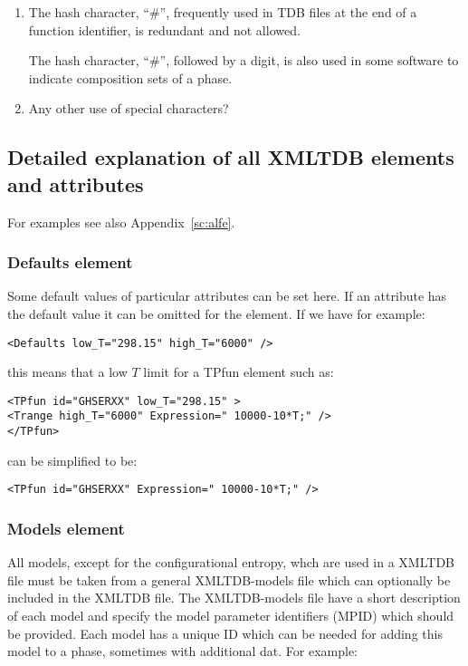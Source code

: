 \documentclass[12pt]{article}
\begin{document}
\begin{appendices}
\begin{enumerate}
\item The hash character, ``\#'', frequently used in TDB files at the
  end of a function identifier, is redundant and not allowed.

  The hash character, ``\#'', followed by a digit, is also used in
  some software to indicate composition sets of a phase.

\item Any other use of special characters?

\end{enumerate}
  
\subsection{Detailed explanation of all XMLTDB elements and attributes}

For examples see also Appendix~\ref{sc:alfe}.

\subsubsection{Defaults element}\label{sc:defaults}

Some default values of particular attributes can be set here.
If an attribute has the default value it can be omitted for the
element.  If we have for example:
\begin{verbatim}
<Defaults low_T="298.15" high_T="6000" />
\end{verbatim}
this means that a low $T$ limit for a TPfun element such as:
\begin{verbatim}
<TPfun id="GHSERXX" low_T="298.15" >
<Trange high_T="6000" Expression=" 10000-10*T;" />
</TPfun>
\end{verbatim}
can be simplified to be:
\begin{verbatim}
<TPfun id="GHSERXX" Expression=" 10000-10*T;" />
\end{verbatim}
  
\subsubsection{Models element}

All models, except for the configurational entropy, whch are used in a
XMLTDB file must be taken from a general XMLTDB-models file which can
optionally be included in the XMLTDB file.  The XMLTDB-models file
have a short description of each model and specify the model parameter
identifiers (MPID) which should be provided.  Each model has a unique
ID which can be needed for adding this model to a phase, sometimes
with additional dat.  For example:


\end{appendices}
\end{document}
